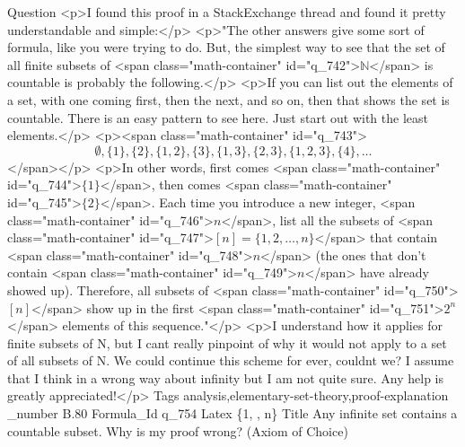 Question <p>I found this proof in a StackExchange thread and found it pretty understandable and simple:</p>  <p>"The other answers give some sort of formula, like you were trying to do.  But, the simplest way to see that the set of all finite subsets of <span class="math-container" id="q_742">$\mathbb{N}$</span> is countable is probably the following.</p>  <p>If you can list out the elements of a set, with one coming first, then the next, and so on, then that shows the set is countable.  There is an easy pattern to see here.  Just start out with the least elements.</p>  <p><span class="math-container" id="q_743">$$\emptyset, \{1\}, \{2\}, \{1, 2\}, \{3\}, \{1, 3\}, \{2, 3\}, \{1, 2, 3\}, \{4\}, \ldots$$</span></p>  <p>In other words, first comes <span class="math-container" id="q_744">$\{1\}$</span>, then comes <span class="math-container" id="q_745">$\{2\}$</span>.  Each time you introduce a new integer, <span class="math-container" id="q_746">$n$</span>, list all the subsets of <span class="math-container" id="q_747">$[n] = \{1, 2, \ldots, n\}$</span> that contain <span class="math-container" id="q_748">$n$</span> (the ones that don't contain <span class="math-container" id="q_749">$n$</span> have already showed up).  Therefore, all subsets of <span class="math-container" id="q_750">$[n]$</span> show up in the first <span class="math-container" id="q_751">$2^{n}$</span> elements of this sequence."</p>  <p>I understand how it applies for finite subsets of N, but I cant really pinpoint of why it would not apply to a set of all subsets of N. We could continue this scheme for ever, couldnt we?  I assume that I think in a wrong way about infinity but I am not quite sure. Any help is greatly appreciated!</p>
Tags analysis,elementary-set-theory,proof-explanation
_number B.80
Formula_Id q_754
Latex \{1, \cdots, n\}
Title Any infinite set contains a countable subset. Why is my proof wrong? (Axiom of Choice)
